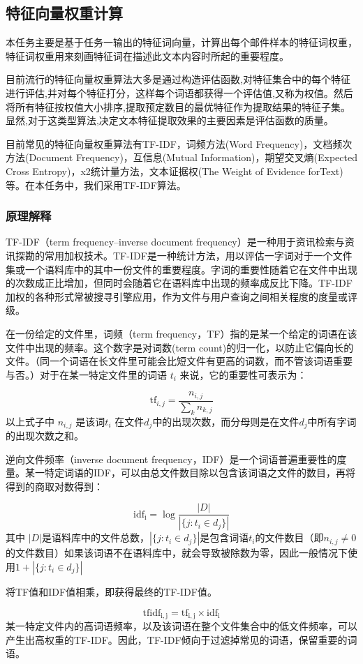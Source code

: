 \documentclass[lang=cn,11pt]{elegantpaper}
\begin{document}
\subsection{特征向量权重计算}
本任务主要是基于任务一输出的特征词向量，计算出每个邮件样本的特征词权重，特征词权重用来刻画特征词在描述此文本内容时所起的重要程度。\par
目前流行的特征向量权重算法大多是通过构造评估函数,对特征集合中的每个特征进行评估,并对每个特征打分，这样每个词语都获得一个评估值,又称为权值。然后将所有特征按权值大小排序,提取预定数目的最优特征作为提取结果的特征子集。显然,对于这类型算法,决定文本特征提取效果的主要因素是评估函数的质量。\par
目前常见的特征向量权重算法有TF-IDF，词频方法(Word Frequency)，文档频次方法(Document Frequency)，互信息(Mutual Information)，期望交叉熵(Expected Cross Entropy)，x2统计量方法，文本证据权(The Weight of Evidence forText)等。在本任务中，我们采用TF-IDF算法。
\subsubsection{原理解释}
TF-IDF（term frequency–inverse document frequency）是一种用于资讯检索与资讯探勘的常用加权技术。TF-IDF是一种统计方法，用以评估一字词对于一个文件集或一个语料库中的其中一份文件的重要程度。字词的重要性随着它在文件中出现的次数成正比增加，但同时会随着它在语料库中出现的频率成反比下降。TF-IDF加权的各种形式常被搜寻引擎应用，作为文件与用户查询之间相关程度的度量或评级。\par
在一份给定的文件里，词频（term frequency，TF）指的是某一个给定的词语在该文件中出现的频率。这个数字是对词数(term count)的归一化，以防止它偏向长的文件。（同一个词语在长文件里可能会比短文件有更高的词数，而不管该词语重要与否。）对于在某一特定文件里的词语 $t_{i}$ 来说，它的重要性可表示为：\par
$$\mathrm{tf}_{i,j}=\frac{n_{i,j}}{\sum_{k}n_{k,j}}$$
以上式子中 $n_{i,j}$ 是该词$t_{i}$ 在文件$d_{j}$中的出现次数，而分母则是在文件$d_{j}$中所有字词的出现次数之和。\par
逆向文件频率（inverse document frequency，IDF）是一个词语普遍重要性的度量。某一特定词语的IDF，可以由总文件数目除以包含该词语之文件的数目，再将得到的商取对数得到：\par
$$\mathrm{idf_{i}} =  \log \frac{|D|}{|\{j: t_{i} \in d_{j}\}|}$$
其中 $|D|$是语料库中的文件总数，$|\{ j: t_{i} \in d_{j}\}|$是包含词语$t_{i}$的文件数目（即$n_{i,j} \neq 0$的文件数目）如果该词语不在语料库中，就会导致被除数为零，因此一般情况下使用$1 + |\{j : t_{i} \in d_{j}\}|$\par
将TF值和IDF值相乘，即获得最终的TF-IDF值。\par
$$\mathrm{tf{}idf_{i,j}} = \mathrm{tf_{i,j}} \times  \mathrm{idf_{i}}$$
某一特定文件内的高词语频率，以及该词语在整个文件集合中的低文件频率，可以产生出高权重的TF-IDF。因此，TF-IDF倾向于过滤掉常见的词语，保留重要的词语。
\end{document}
